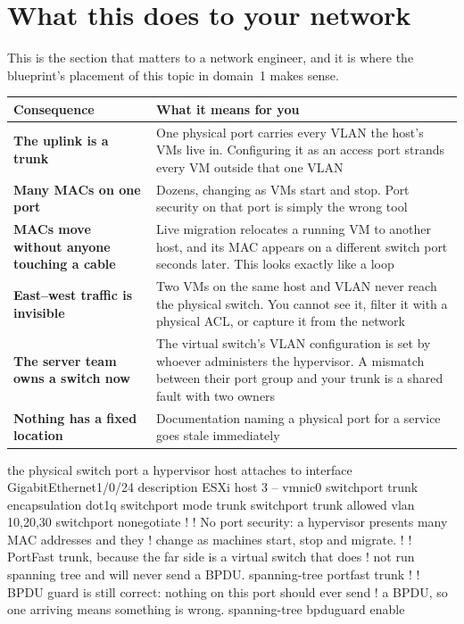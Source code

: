 \section{What this does to your network}\label{sec:vnetimpact}

This is the section that matters to a network engineer, and it is where the
blueprint's placement of this topic in domain~1 makes sense.

\begin{longtable}{@{}L{4.6cm}L{10.4cm}@{}}
\toprule
{}
\textbf{Consequence} & \textbf{What it means for you} \\
\midrule
\endhead
\textbf{The uplink is a trunk} &
One physical port carries every VLAN the host's VMs live in. Configuring it as an
access port strands every VM outside that one VLAN \\
\textbf{Many MACs on one port} &
Dozens, changing as VMs start and stop. Port security on that port is simply
the wrong tool \\
\textbf{MACs move without anyone touching a cable} &
Live migration relocates a running VM to another host, and its MAC appears on a
different switch port seconds later. This looks exactly like a loop \\
\textbf{East--west traffic is invisible} &
Two VMs on the same host and VLAN never reach the physical switch. You cannot
see it, filter it with a physical ACL, or capture it from the network \\
\textbf{The server team owns a switch now} &
The virtual switch's VLAN configuration is set by whoever administers the
hypervisor. A mismatch between their port group and your trunk is a shared fault
with two owners \\
\textbf{Nothing has a fixed location} &
Documentation naming a physical port for a service goes stale immediately \\
\bottomrule
\end{longtable}

\begin{config}{the physical switch port a hypervisor host attaches to}
interface GigabitEthernet1/0/24
 description ESXi host 3 -- vmnic0
 switchport trunk encapsulation dot1q
 switchport mode trunk
 switchport trunk allowed vlan 10,20,30
 switchport nonegotiate
!
! No port security: a hypervisor presents many MAC addresses and they
! change as machines start, stop and migrate.
!
! PortFast trunk, because the far side is a virtual switch that does
! not run spanning tree and will never send a BPDU.
 spanning-tree portfast trunk
!
! BPDU guard is still correct: nothing on this port should ever send
! a BPDU, so one arriving means something is wrong.
 spanning-tree bpduguard enable
\end{config}

